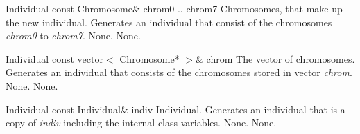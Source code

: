 \vspace*{4ex}

\setNormalInstance
\printMethodWithOneParam
{}
{Individual}
{const Chromosome\&}
{chrom0 .. chrom7}
{Chromosomes, that make up the new individual.}
{Generates an individual that consist of the chromosomes {\em chrom0}
 to {\em chrom7}.}
{None.}
{None.}

\clearpage

\setNormalInstance
\printMethodWithOneParam
{}
{Individual}
{const vector$<$ Chromosome* $>$\&}
{chrom}
{The vector of chromosomes.}
{Generates an individual that consists of the chromosomes stored in 
 vector {\em chrom}.}
{None.}
{None.}

\vspace*{4ex}

\setNormalInstance
\printMethodWithOneParam
{}
{Individual}
{const Individual\&}
{indiv}
{Individual.}
{Generates an individual that is a copy of {\em indiv} including
 the internal class variables.}
{None.}
{None.}
